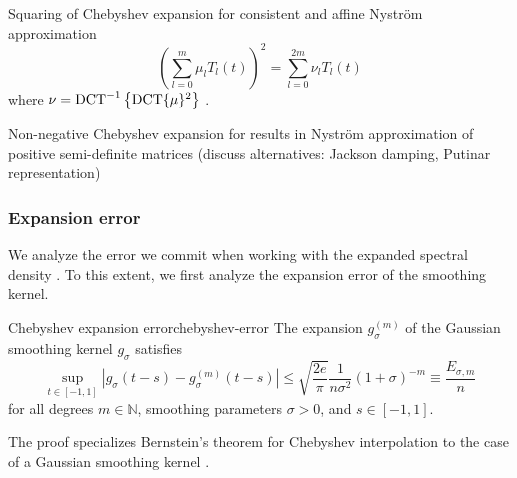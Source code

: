 \documentclass[12pt]{article}
\begin{document}
Squaring of Chebyshev expansion for consistent and affine Nyström approximation
\begin{equation}
    \left( \sum_{l=0}^{m} \mu_l T_l(t) \right)^2 = \sum_{l=0}^{2m} \nu_l T_l(t)
    \label{equ:squared-chebyshev-expansion}
\end{equation}
where $\nu = \operatorname{DCT}^{-1} \left\{ \operatorname{DCT}\{\mu\}^2 \right\}$ .

Non-negative Chebyshev expansion for results in Nyström approximation of positive semi-definite matrices (discuss alternatives: Jackson damping, Putinar representation) 

\subsubsection{Expansion error}
\label{subsubsec:expansion-error}

We analyze the error we commit when working with the expanded spectral density . To this extent, we first analyze the expansion error of the smoothing kernel.

\begin{lemma}{Chebyshev expansion error}{chebyshev-error}
    The expansion $g_{\sigma}^{(m)}$ of the Gaussian smoothing kernel $g_{{\sigma}}$ satisfies
    \begin{equation}
        \sup_{t \in [-1, 1]} \left| g_{\sigma}(t - s) - g_{\sigma}^{(m)}(t - s) \right| \leq \sqrt{\frac{2e}{\pi}} \frac{1}{n \sigma^2} (1 + \sigma)^{-m} \equiv \frac{E_{\sigma, m}}{n}
        \label{equ:2-chebyshev-interpolation-sup-error-kernel}
    \end{equation}
    for all degrees $m \in \mathbb{N}$, smoothing parameters $\sigma > 0$, and $s \in [-1, 1]$.
\end{lemma}

The proof specializes Bernstein's theorem for Chebyshev interpolation to the case of a Gaussian smoothing kernel .
\end{document}
